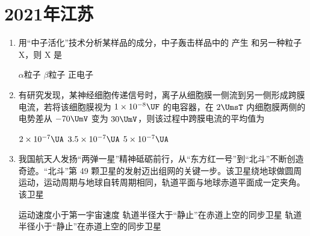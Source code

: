 \documentclass[\gkver]{gaokaozhenti}
\begin{document}
\chapter{2021年江苏}

\begin{enumerate}
\item
用“中子活化”技术分析某样品的成分，中子轰击样品中的  产生  和另一种粒子 X，则 X 是

{$\alpha$粒子}
{$\beta$粒子}
{正电子}


\item
有研究发现，某神经细胞传递信号时，离子从细胞膜一侧流到另一侧形成跨膜电流，若将该细胞膜视为 $1\times10^{-8}\UF$ 的电容器，在 $2\UmsT$ 内细胞膜两侧的电势差从 $-70\UmV$ 变为 $30\UmV$，则该过程中跨膜电流的平均值为

{$2\times10^{-7}\UA$}
{$3.5\times10^{-7}\UA$}
{$5\times10^{-7}\UA$}


\item
我国航天人发扬“两弹一星”精神砥砺前行，从“东方红一号”到“北斗”不断创造奇迹。“北斗”第 49 颗卫星的发射迈出组网的关键一步。该卫星绕地球做圆周运动，运动周期与地球自转周期相同，轨道平面与地球赤道平面成一定夹角。该卫星

{运动速度小于第一宇宙速度}
{轨道半径大于“静止”在赤道上空的同步卫星}
{轨道半径小于“静止”在赤道上空的同步卫星}


\end{enumerate}
\end{document}
